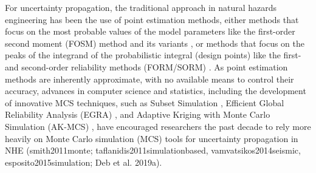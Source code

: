For uncertainty propagation, the traditional approach in natural hazards engineering has been the use of point estimation methods, either methods that focus on the most probable values of the model parameters like the first-order second moment (FOSM) method \citep{baker2008uncertainty} and its variants \citep{vamvatsikos2013derivation}, or methods that focus on the peaks of the integrand of the probabilistic integral (design points) like the first- and second-order reliability methods (FORM/SORM) \citep{koduru2010feasibility}. As point estimation methods are inherently approximate, with no available means to control their accuracy, advances in computer science and statistics, including the development of innovative MCS techniques, such as Subset Simulation \citep{au2003subset}, Efficient Global Reliability Analysis (EGRA) \citep{bichon2013efficient}, and Adaptive Kriging with Monte Carlo Simulation (AK-MCS) \citep{echard2011akmcs}, have encouraged researchers the past decade to rely more heavily on Monte Carlo simulation (MCS) tools for uncertainty propagation in NHE (smith2011monte; taflanidis2011simulationbased, vamvatsikos2014seismic, esposito2015simulation; Deb et al. 2019a). 


